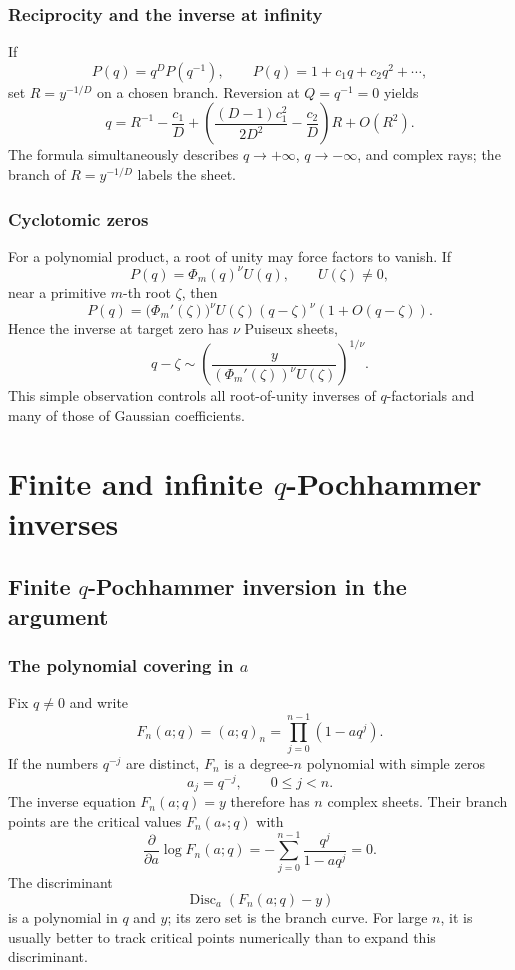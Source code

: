 \documentclass[11pt,letterpaper,oneside,openany]{book}
\theoremstyle{definition}
\theoremstyle{remark}
\newcommand{\Disc}{\operatorname{Disc}}
\begin{document}
\section{Reciprocity and the inverse at infinity}
If
\[
 P(q)=q^DP(q^{-1}),
 \qquad P(q)=1+c_1q+c_2q^2+\cdots,
\]
set \(R=y^{-1/D}\) on a chosen branch.  Reversion at \(Q=q^{-1}=0\) yields
\begin{equation}\label{eq:palindromic-large-inverse}
 q=R^{-1}-\frac{c_1}{D}
 +\left(\frac{(D-1)c_1^2}{2D^2}-\frac{c_2}{D}\right)R+O(R^2).
\end{equation}
The formula simultaneously describes \(q\to+\infty\), \(q\to-\infty\), and
complex rays; the branch of \(R=y^{-1/D}\) labels the sheet.

\section{Cyclotomic zeros}
For a polynomial product, a root of unity may force factors to vanish.  If
\[
 P(q)=\Phi_m(q)^\nu U(q),\qquad U(\zeta)\ne0,
\]
near a primitive \(m\)-th root \(\zeta\), then
\[
 P(q)=\bigl(\Phi_m'(\zeta)\bigr)^\nu U(\zeta)(q-\zeta)^\nu
 (1+O(q-\zeta)).
\]
Hence the inverse at target zero has \(\nu\) Puiseux sheets,
\[
 q-\zeta\sim
 \left(\frac{y}{(\Phi_m'(\zeta))^\nu U(\zeta)}\right)^{1/\nu}.
\]
This simple observation controls all root-of-unity inverses of
\(q\)-factorials and many of those of Gaussian coefficients.

\part{Finite and infinite \texorpdfstring{\(q\)}{q}-Pochhammer inverses}

\chapter{Finite \texorpdfstring{\(q\)}{q}-Pochhammer inversion in the argument}

\section{The polynomial covering in \texorpdfstring{\(a\)}{a}}
Fix \(q\ne0\) and write
\[
 F_n(a;q)=(a;q)_n=\prod_{j=0}^{n-1}(1-aq^j).
\]
If the numbers \(q^{-j}\) are distinct, \(F_n\) is a degree-\(n\) polynomial
with simple zeros
\[
 a_j=q^{-j},\qquad 0\le j<n.
\]
The inverse equation \(F_n(a;q)=y\) therefore has \(n\) complex sheets.  Their
branch points are the critical values \(F_n(a_*;q)\) with
\[
 \frac{\partial}{\partial a}\log F_n(a;q)
 =-\sum_{j=0}^{n-1}\frac{q^j}{1-aq^j}=0.
\]
The discriminant
\[
 \Disc_a(F_n(a;q)-y)
\]
is a polynomial in \(q\) and \(y\); its zero set is the branch curve.  For
large \(n\), it is usually better to track critical points numerically than to
expand this discriminant.
\end{document}
